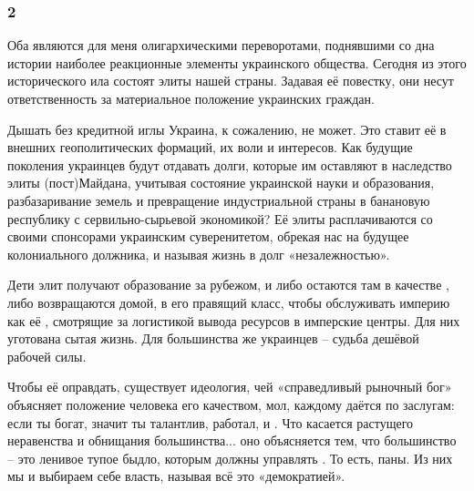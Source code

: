  
 
 
 
 
\subsubsection{2}
\label{sec:22_11_2021.fb.uljanov_anatolij.1.maidan.2}

Оба  являются для меня олигархическими переворотами, поднявшими со дна
истории наиболее реакционные элементы украинского общества. Сегодня из этого
исторического ила состоят элиты нашей страны. Задавая её повестку, они несут
ответственность за материальное положение украинских граждан. 

Дышать без кредитной иглы Украина, к сожалению, не может. Это ставит её в
 внешних геополитических формаций, их воли и
интересов. Как будущие поколения украинцев будут отдавать долги, которые им
оставляют в наследство элиты (пост)Майдана, учитывая состояние украинской науки
и образования, разбазаривание земель и превращение индустриальной страны в
банановую республику с сервильно-сырьевой экономикой? Её элиты расплачиваются
со своими спонсорами украинским суверенитетом, обрекая нас на будущее
колониального должника, и называя жизнь в долг «незалежностью».

Дети элит получают образование за рубежом, и либо остаются там в качестве
, либо возвращаются домой, в его правящий класс, чтобы
обслуживать империю как её , смотрящие за логистикой
вывода ресурсов в имперские центры. Для них уготована сытая жизнь. Для
большинства же украинцев – судьба дешёвой рабочей силы. 

Чтобы её оправдать, существует идеология, чей «справедливый рыночный бог»
объясняет положение человека его качеством, мол, каждому даётся по заслугам:
если ты богат, значит ты талантлив, работал, и . Что касается растущего
неравенства и обнищания большинства... оно объясняется тем, что большинство – это
ленивое тупое быдло, которым должны управлять . То есть, паны. Из них мы и выбираем себе власть, называя всё
это «демократией».
